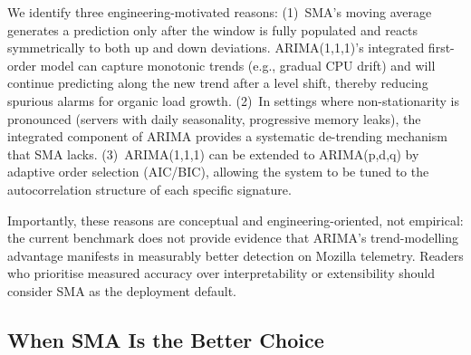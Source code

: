 \documentclass[pdflatex,sn-nature]{sn-jnl}
\theoremstyle{thmstyleone}%
\begin{document}
We identify three engineering-motivated reasons:
(1)~SMA's moving average generates a prediction only after the window is fully
populated and reacts symmetrically to both up and down deviations.
ARIMA(1,1,1)'s integrated first-order model can capture monotonic trends
(e.g., gradual CPU drift) and will continue predicting along the new trend
after a level shift, thereby reducing spurious alarms for organic load growth.
(2)~In settings where non-stationarity is pronounced (servers with daily
seasonality, progressive memory leaks), the integrated component of ARIMA
provides a systematic de-trending mechanism that SMA lacks.
(3)~ARIMA(1,1,1) can be extended to ARIMA(p,d,q) by adaptive order
selection (AIC/BIC), allowing the system to be tuned to the
autocorrelation structure of each specific signature.

Importantly, these reasons are conceptual and engineering-oriented, not
empirical: the current benchmark does not provide evidence that ARIMA's
trend-modelling advantage manifests in measurably better detection on
Mozilla telemetry.
Readers who prioritise measured accuracy over interpretability or
extensibility should consider SMA as the deployment default.

\subsection{When SMA Is the Better Choice}
\end{document}
